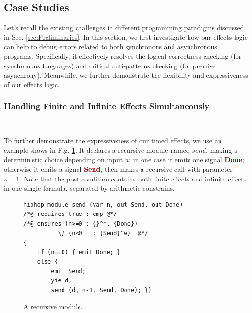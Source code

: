 \documentclass[acmsmall,10pt,review]{acmart}
\newcommand{\anyevent}[1]{{\textcolor{darkred}
{{\textbf{\footnotesize #1}}}}}
\newcommand{\code}[1]{{\tt{\ensuremath{\m{#1}}}}}
\newcommand{\m}{\mathit}
\newcommand\figref[1]{Fig. \textcolor{black}{\ref{#1}}.}
\newcommand\secref[1]{Sec. \textcolor{black}{\ref{#1}}}
\begin{document}
\subsection{Case Studies}
\label{subsec:Case_Studies}

Let's recall the existing challenges in different programming paradigms discussed in \secref{sec:Preliminaries}. In this section, we first investigate how our effects logic can help to debug errors related to both synchronous and asynchronous programs. Specifically, it effectively resolves the logical correctness checking (for synchronous languages) and critical anti-patterns checking (for premise asynchrony). 
Meanwhile, we further demonstrate the flexibility and expressiveness of our effects logic. 







\subsubsection{Handling Finite and Infinite Effects Simultaneously}~\\
\label{rec:finit_infinite}

      \vspace{-2mm}
To further demonstrate the expressiveness of our timed effects, we use an example shows in \figref{fig:case_study_finit_infinit}
It declares a recursive module named \code{send}, making a deterministic choice depending on input \code{n}: in one case it emits one  signal  \anyevent{Done}; otherwise it emits a signal 
\anyevent{Send}, then makes a recursive call with parameter \code{n{-}1}.  Note that the post condition contains both finite effects and infinite effects in one single formula, separated by arithmetic constrains. 




\begin{figure}
      \vspace{-2mm}
\begin{lstlisting}[columns=fullflexible]
hiphop module send (var n, out Send, out Done)
/*@ requires true : emp @*/
/*@ ensures	(n>=0 : {}^*. {Done}) 
          \/ (n<0   : {Send}^w)  @*/
{
	if (n==0) { emit Done; }
	else {
		emit Send;
		yield;
		send (d, n-1, Send, Done); }}
\end{lstlisting}  
      \vspace{-1mm}
      \caption{A recursive  module.}\label{fig:case_study_finit_infinit}
         \vspace{-2mm}
\end{figure}
\end{document}
